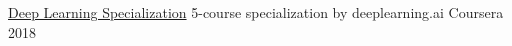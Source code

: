 

\begin{cvhonors}


  \cvhonor
    {\href{https://www.coursera.org/account/accomplishments/specialization/7HYKL994GYY6}{Deep Learning Specialization}} %
    {5-course specialization by deeplearning.ai} %
    {Coursera} %
    {2018} %

\end{cvhonors}

